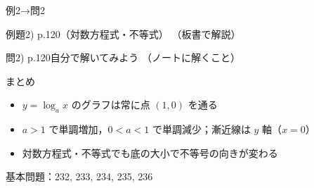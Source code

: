 \documentclass[aspectratio=43,professionalfonts,handout]{beamer}
\begin{document}
\begin{frame}{例2→問2}
  \begin{exampleblock}{例題2) p.120（対数方程式・不等式）}
    （板書で解説）
  \end{exampleblock}

  \vfill

  \begin{block}{問2) p.120\quad 自分で解いてみよう}
    （ノートに解くこと）
  \end{block}
\end{frame}

\begin{frame}{まとめ}
  \begin{itemize}
    \item $y = \log_a x$ のグラフは常に点 $(1, 0)$ を通る
    \item $a > 1$ で単調増加，$0 < a < 1$ で単調減少；漸近線は $y$ 軸（$x = 0$）
    \item 対数方程式・不等式でも底の大小で不等号の向きが変わる
  \end{itemize}

  \vfill
  {\small 基本問題：232, 233, 234, 235, 236}
\end{frame}
\end{document}
